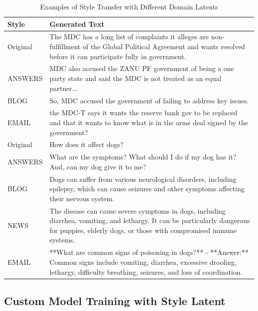 \documentclass[twocolumn]{article}
\begin{document}
\begin{table}[H]
    \centering
    \caption{Examples of Style Transfer with Different Domain Latents}
    \label{tab:style-transfer-examples}
    \begin{tabularx}{\textwidth}{>{\raggedright\arraybackslash}p{2.5cm} X}
        \hline
        \textbf{Style} & \textbf{Generated Text} \\
        \hline
        Original & The MDC has a long list of complaints it alleges are non-fulfillment of the Global Political Agreement and wants resolved before it can participate fully in government. \\
        \hline
        ANSWERS & MDC also accused the ZANU PF government of being a one party state and said the MDC is not treated as an equal partner... \\
        \hline
        BLOG & So, MDC accused the government of failing to address key issues. \\
        \hline
        EMAIL & the MDC-T says it wants the reserve bank gov to be replaced and that it wants to know what is in the arms deal signed by the government? \\
        \hline
        \hline
        Original & How does it affect dogs? \\
        \hline
        ANSWERS & What are the symptoms? What should I do if my dog has it? And, can my dog give it to me? \\
        \hline
        BLOG & Dogs can suffer from various neurological disorders, including epilepsy, which can cause seizures and other symptoms affecting their nervous system. \\
        \hline
        NEWS & The disease can cause severe symptoms in dogs, including diarrhea, vomiting, and lethargy. It can be particularly dangerous for puppies, elderly dogs, or those with compromised immune systems. \\
        \hline
        EMAIL & **What are common signs of poisoning in dogs?** - **Answer:** Common signs include vomiting, diarrhea, excessive drooling, lethargy, difficulty breathing, seizures, and loss of coordination. \\
        \hline
    \end{tabularx}
\end{table}
\twocolumn

\subsection{Custom Model Training with Style Latent}
\end{document}
